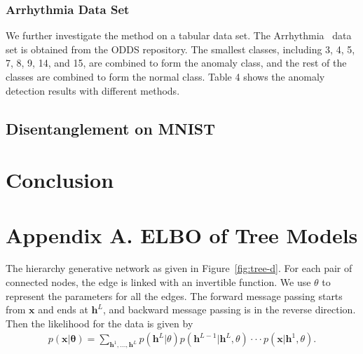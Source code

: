 \documentclass{article} %
\begin{document}
\subsubsection{Arrhythmia Data Set}
We further investigate the method on a tabular data set.  The Arrhythmia~\cite{Dua:2019}  data set is  obtained from the ODDS repository. The smallest classes, including 3, 4, 5, 7, 8, 9, 14, and 15, are combined to form the anomaly class, and the rest of the classes are combined to form the normal class. Table 4 shows the anomaly detection results with different methods. 


\subsection{Disentanglement on MNIST}


\section{Conclusion}





\clearpage
\section*{Appendix A.  ELBO of Tree Models}\label{appd:tree_elbo}

The hierarchy generative network as given in Figure~\ref{fig:tree-d}. For each pair of connected nodes, the edge is linked with an invertible function. We use $\theta$ to represent the parameters for all the edges.
The forward message passing starts from $\mathbf{x}$ and ends at $\mathbf{h}^L$, and backward message passing is in the reverse direction. 
 Then the
 likelihood for the data is given by
\begin{align*}
p(\mathbf{x}| \mathbf{\theta}) = \sum_{\mathbf{h}^1, ..., \mathbf{h}^L} p(\mathbf{h}^L | \theta)p(\mathbf{h}^{L-1} | \mathbf{h}^{L},\theta) \cdot \cdot  \cdot  p(\mathbf{x} | \mathbf{h}^{1}, \theta) .
\end{align*}
\end{document}
